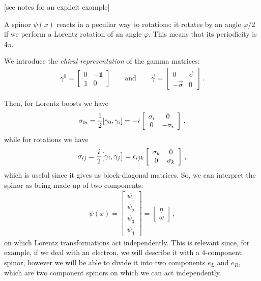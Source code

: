\documentclass[main.tex]{subfiles}
\begin{document}
[see notes for an explicit example]

A spinor \(\psi (x)\) reacts in a peculiar way to rotations: it rotates by an angle \( \varphi /2 \) if we perform a Lorentz rotation of an angle \(\varphi \). 
This means that its periodicity is \(4\pi \).  

We introduce the \emph{chiral representation} of the gamma matrices: 
%
\begin{subequations}
\begin{align}
\gamma^{0} = \left[\begin{array}{cc}
0 & -\mathbb{1} \\ 
\mathbb{1} & 0
\end{array}\right]
\qquad \text{and} \qquad
\vec{\gamma} = \left[\begin{array}{cc}
0 & \vec{\sigma}  \\ 
-\vec{\sigma} & 0
\end{array}\right]
\,.
\end{align}
\end{subequations}

Then, for Lorentz boosts we have 
%
\begin{subequations}
\begin{align}
\sigma_{0i} = \frac{1}{2} \qty[\gamma_0, \gamma_{i}] = -i \left[\begin{array}{cc}
\sigma_{i} & 0 \\ 
0 & - \sigma_{i}
\end{array}\right]
\,,
\end{align}
\end{subequations}
%
while for rotations we have 
%
\begin{subequations}
\begin{align}
\sigma_{ij} = \frac{i}{2} \qty[\gamma_{i}, \gamma_{j}] = \epsilon_{ijk} \left[\begin{array}{cc}
\sigma_{k} & 0 \\ 
0 & \sigma_{k}
\end{array}\right]
\,,
\end{align}
\end{subequations}
%
which is useful since it gives us block-diagonal matrices. 
So, we can interpret the spinor as being made up of two components: 
%
\begin{subequations}
\begin{align}
\psi (x) = \left[\begin{array}{c}
\psi_1  \\ 
\psi_2  \\ 
\psi_3   \\ 
\psi_4 
\end{array}\right] 
= \left[\begin{array}{c}
\eta  \\ 
\omega 
\end{array}\right]
\,,
\end{align}
\end{subequations}
%
on which Lorentz transformations act independently. 
This is relevant since, for example, if we deal with an electron, we  will describe it with a 4-component spinor, however we will be able to divide it into two components \(e_L\) and \(e_R\), which are two component spinors on which we can act independently. 
\end{document}
